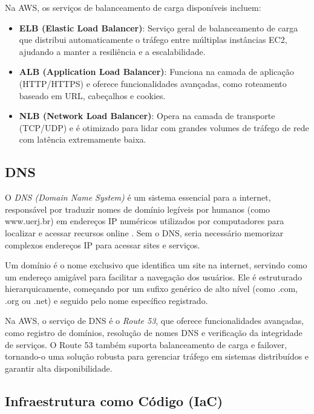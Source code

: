 Na AWS, os serviços de balanceamento de carga disponíveis incluem:

\begin{itemize}
    \item \textbf{ELB (Elastic Load Balancer)}: Serviço geral de balanceamento de carga que distribui automaticamente o tráfego entre múltiplas instâncias EC2, ajudando a manter a resiliência e a escalabilidade.
    \item \textbf{ALB (Application Load Balancer)}: Funciona na camada de aplicação (HTTP/HTTPS) e oferece funcionalidades avançadas, como roteamento baseado em URL, cabeçalhos e cookies.
    \item \textbf{NLB (Network Load Balancer)}: Opera na camada de transporte (TCP/UDP) e é otimizado para lidar com grandes volumes de tráfego de rede com latência extremamente baixa.
\end{itemize}

\subsection{DNS}


O \emph{DNS (Domain Name System)} é um sistema essencial para a internet, responsável por traduzir nomes de domínio legíveis por humanos (como www.uerj.br) em endereços IP numéricos utilizados por computadores para localizar e acessar recursos online \cite{what-is-dns}. Sem o DNS, seria necessário memorizar complexos endereços IP para acessar sites e serviços.

Um domínio é o nome exclusivo que identifica um site na internet, servindo como um endereço amigável para facilitar a navegação dos usuários. Ele é estruturado hierarquicamente, começando por um sufixo genérico de alto nível (como .com, .org ou .net) e seguido pelo nome específico registrado.

Na AWS, o serviço de DNS é o \emph{Route 53}, que oferece funcionalidades avançadas, como registro de domínios, resolução de nomes DNS e verificação da integridade de serviços. O Route 53 também suporta balanceamento de carga e failover, tornando-o uma solução robusta para gerenciar tráfego em sistemas distribuídos e garantir alta disponibilidade.

\subsection{Infraestrutura como Código (IaC)}

